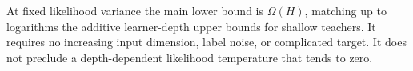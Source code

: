 At fixed likelihood variance the main lower bound is $\Omega(H)$, matching up to logarithms the additive learner-depth upper bounds for shallow teachers. It requires no increasing input dimension, label noise, or complicated target. It does not preclude a depth-dependent likelihood temperature that tends to zero.
